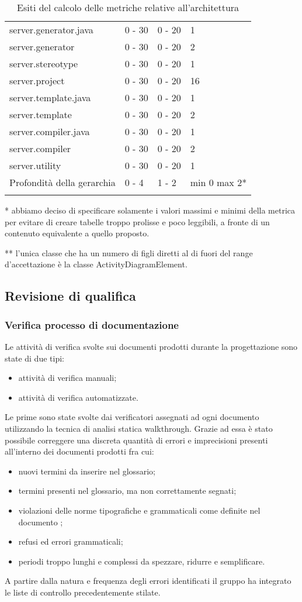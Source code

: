 \begin{longtable}{|p{5.5cm}|p{2.25cm}|p{2.25cm}|p{2.25cm}|}
		server.generator.java &0 - 30 &0 - 20 &1\\
		server.generator &0 - 30 &0 - 20 &2\\
		server.stereotype &0 - 30 &0 - 20 &1\\
		server.project &0 - 30 &0 - 20 &16\\
		server.template.java &0 - 30 &0 - 20 &1\\
		server.template &0 - 30 &0 - 20 &2\\
		server.compiler.java &0 - 30 &0 - 20 &1\\
		server.compiler &0 - 30 &0 - 20 &2\\
		server.utility &0 - 30 &0 - 20 &1\\
		\hline
		Profondità della gerarchia &0 - 4 &1 - 2 &min 0 max 2*\\
		\hline
		\caption{Esiti del calcolo delle metriche relative all'architettura}
		\end{longtable}
	* abbiamo deciso di specificare solamente i valori massimi e minimi della metrica per evitare di creare tabelle troppo prolisse e poco leggibili, a fronte di un contenuto equivalente a quello proposto.
	
	** l'unica classe che ha un numero di figli diretti al di fuori del range d'accettazione è la classe ActivityDiagramElement.

\subsection{Revisione di qualifica}
		\subsubsection{Verifica processo di documentazione}
		Le attività di verifica svolte sui documenti prodotti durante la progettazione sono state di due tipi:
		\begin{itemize}		
			\item attività di verifica manuali;
			\item attività di verifica automatizzate.
		\end{itemize}
		
		Le prime sono state svolte dai verificatori assegnati ad ogni documento utilizzando la tecnica di 					analisi statica walkthrough. Grazie ad essa è stato possibile correggere una discreta quantità di errori e imprecisioni presenti all'interno dei documenti prodotti fra cui: 
		\begin{itemize}	
			\item nuovi termini da inserire nel glossario;
			\item termini presenti nel glossario, ma non correttamente segnati;
			\item violazioni delle norme tipografiche e grammaticali come definite nel documento \NdP;
			\item refusi ed errori grammaticali;
			\item periodi troppo lunghi e complessi da spezzare, ridurre e semplificare.
		\end{itemize}
		A partire dalla natura e frequenza degli errori identificati il gruppo ha integrato le liste di controllo precedentemente stilate.

